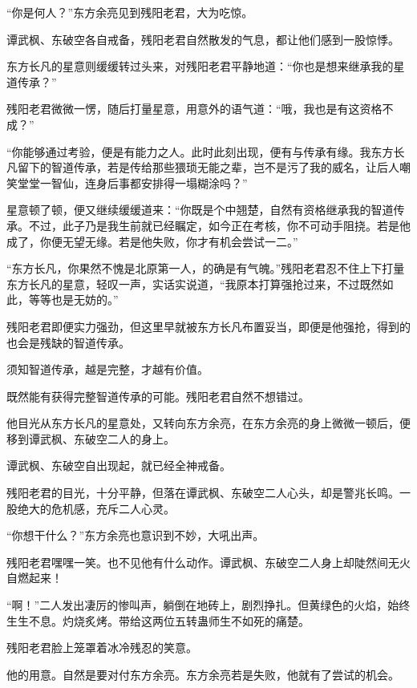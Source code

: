 
\begin{this_body}



“你是何人？”东方余亮见到残阳老君，大为吃惊。

谭武枫、东破空各自戒备，残阳老君自然散发的气息，都让他们感到一股惊悸。

东方长凡的星意则缓缓转过头来，对残阳老君平静地道：“你也是想来继承我的星道传承？”

残阳老君微微一愣，随后打量星意，用意外的语气道：“哦，我也是有这资格不成？”

“你能够通过考验，便是有能力之人。此时此刻出现，便有与传承有缘。我东方长凡留下的智道传承，若是传给那些猥琐无能之辈，岂不是污了我的威名，让后人嘲笑堂堂一智仙，连身后事都安排得一塌糊涂吗？”

星意顿了顿，便又继续缓缓道来：“你既是个中翘楚，自然有资格继承我的智道传承。不过，此子乃是我生前就已经瞩定，如今正在考核，你不可动手阻挠。若是他成了，你便无望无缘。若是他失败，你才有机会尝试一二。”

“东方长凡，你果然不愧是北原第一人，的确是有气魄。”残阳老君忍不住上下打量东方长凡的星意，轻叹一声，实话实说道，“我原本打算强抢过来，不过既然如此，等等也是无妨的。”

残阳老君即便实力强劲，但这里早就被东方长凡布置妥当，即便是他强抢，得到的也会是残缺的智道传承。

须知智道传承，越是完整，才越有价值。

既然能有获得完整智道传承的可能。残阳老君自然不想错过。

他目光从东方长凡的星意处，又转向东方余亮，在东方余亮的身上微微一顿后，便移到谭武枫、东破空二人的身上。

谭武枫、东破空自出现起，就已经全神戒备。

残阳老君的目光，十分平静，但落在谭武枫、东破空二人心头，却是警兆长鸣。一股绝大的危机感，充斥二人心灵。

“你想干什么？”东方余亮也意识到不妙，大吼出声。

残阳老君嘿嘿一笑。也不见他有什么动作。谭武枫、东破空二人身上却陡然间无火自燃起来！

“啊！”二人发出凄厉的惨叫声，躺倒在地砖上，剧烈挣扎。但黄绿色的火焰，始终生生不息。灼烧炙烤。带给这两位五转蛊师生不如死的痛楚。

残阳老君脸上笼罩着冰冷残忍的笑意。

他的用意。自然是要对付东方余亮。东方余亮若是失败，他就有了尝试的机会。


\end{this_body}
